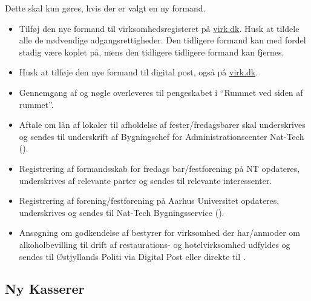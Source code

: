 Dette skal kun gøres, hvis der er valgt en ny formand.
\begin{itemize}
    \item Tilføj den nye formand til virksomhedsregisteret på \url{virk.dk}. Husk at tildele
    alle de nødvendige adgangsrettigheder. Den tidligere formand kan med fordel stadig være koplet på,
    mens den tidligere tidligere formand kan fjernes.
    \item Husk at tilføje den nye formand til digital post, også på \url{virk.dk}.
    \item Gennemgang af og nøgle overleveres til pengeskabet i ``Rummet ved siden af rummet''.
    \item Aftale om lån af lokaler til afholdelse af fester/fredagsbarer skal underskrives og
    sendes til underskrift af Bygningschef for Administrationscenter Nat-Tech ().
    \item Registrering af formandsskab for fredags bar/festforening på NT opdateres, underskrives
    af relevante parter og sendes til relevante interessenter.
    \item Registrering af forening/festforening på Aarhus Universitet opdateres, underskrives og sendes 
    til Nat-Tech Bygningsservice ().
    \item Ansøgning om godkendelse af bestyrer for virksomhed der har/anmoder om alkoholbevilling 
    til drift af restaurations- og hotelvirksomhed udfyldes og sendes til Østjyllands Politi via
    Digital Post eller direkte til .
\end{itemize}

\subsection{Ny Kasserer}
\label{sec:ny-kasserer}

